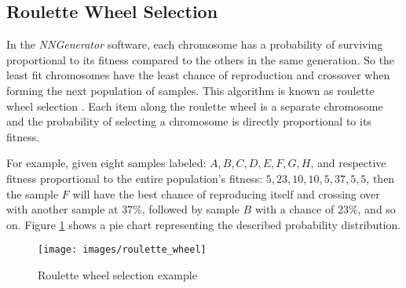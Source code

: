 \subsection{Roulette Wheel Selection}
In the {\it NNGenerator} software, each chromosome has a probability of surviving proportional to its fitness compared to the others in the same generation. 
So the least fit chromosomes have the least chance of reproduction and crossover when forming the next population of samples. 
This algorithm is known as roulette wheel selection \cite{goldberg2}.
Each item along the roulette wheel is a separate chromosome and the probability of selecting a chromosome is directly proportional to its fitness.

For example, given eight samples labeled: $A, B, C, D, E, F, G, H$, and respective fitness proportional to the entire population's fitness: 
$5, 23, 10, 10, 5, 37, 5, 5$, then the sample $F$ will have the best chance of reproducing itself and crossing over with another sample at $37\%$, followed by sample $B$ with a chance of $23\%$, and so on.
Figure \ref{roulette_wheel} shows a pie chart representing the described probability distribution.

\begin{figure}[h!]
  \centering
  \texttt{[image: images/roulette\_wheel]}
  \caption{Roulette wheel selection example}
  \label{roulette_wheel}
\end{figure}
